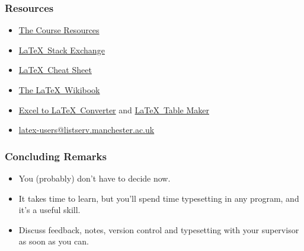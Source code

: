 \documentclass{beamer}
\begin{document}
\begin{frame} \frametitle{Resources}
	\begin{itemize}
		\item \href{http://www.github.com/tombishop1/thesis-latex-manc-coursematerials}{The Course Resources}
		\item \href{http://tex.stackexchange.com}{\LaTeX \ Stack Exchange}
		\item \href{https://wch.github.io/latexsheet/}{\LaTeX \ Cheat Sheet}
		\item \href{https://en.wikibooks.org/wiki/LaTeX}{The \LaTeX \ Wikibook}
		\item \href{https://www.ctan.org/pkg/excel2latex?lang=en}{Excel to \LaTeX \ Converter} and \href{http://www.tablesgenerator.com/}{\LaTeX \ Table Maker}
		\item \href{latex-users@listserv.manchester.ac.uk}{latex-users@listserv.manchester.ac.uk}
	\end{itemize}
\end{frame}

\begin{frame} \frametitle{Concluding Remarks}
	\begin{itemize}
		\item You (probably) don't have to decide now.
		\item It takes time to learn, but you'll spend time typesetting in any program, and it's a useful skill.
		\item Discuss feedback, notes, version control and typesetting with your supervisor as soon as you can.
	\end{itemize}
\end{frame}

\begin{frame}
\doclicenseThis
\end{frame}
\end{document}
